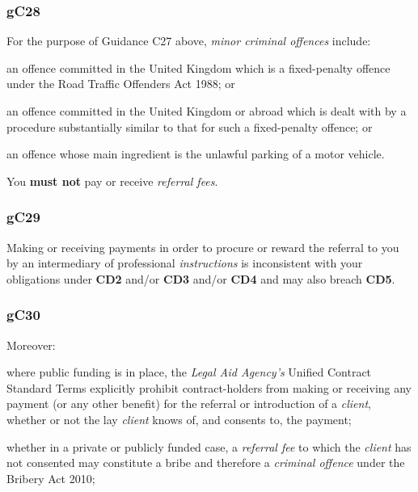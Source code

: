 \subsubsection{\color{darkgrey}gC28}

For the purpose of Guidance C27 above, \emph{minor criminal offences}
include:
\begin{numlist}\item an offence committed in the United Kingdom which is a fixed-penalty
offence under the Road Traffic Offenders Act 1988; or
\item an offence committed in the United Kingdom or abroad which is dealt
with by a procedure substantially similar to that for such a
fixed-penalty offence; or
\item an offence whose main ingredient is the unlawful parking of a motor
vehicle.
\end{numlist}




You \textcolor{myred}{\textbf{must not}} pay or receive \emph{referral fees}.




\subsubsection{\color{darkgrey}gC29}

Making or receiving payments in order to procure or reward the referral
to you by an intermediary of professional \emph{instructions} is
inconsistent with your obligations under \textbf{\textcolor{mygold}{CD2}} and/or  \textbf{\textcolor{mygold}{CD3}} and/or  \textbf{\textcolor{mygold}{CD4}} and
may also breach  \textbf{\textcolor{mygold}{CD5}}.

\subsubsection{\color{darkgrey}gC30}

Moreover:
\begin{numlist}\item where public funding is in place, the \emph{Legal Aid Agency's}
Unified Contract Standard Terms explicitly prohibit contract-holders
from making or receiving any payment (or any other benefit) for the
referral or introduction of a \emph{client}, whether or not the lay
\emph{client} knows of, and consents to, the payment;
\item whether in a private or publicly funded case, a \emph{referral fee}
to which the \emph{client} has not consented may constitute a bribe and
therefore a \emph{criminal offence} under the Bribery Act 2010;
\end{numlist}

